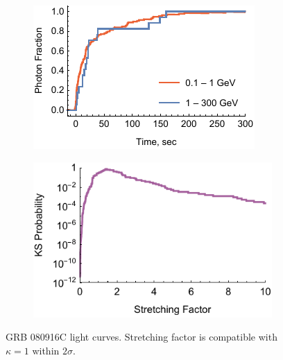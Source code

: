 \documentclass{article}
\begin{document}
\begin{figure}
        \centering
        \begin{subfigure}{0.49\textwidth}
                \includegraphics[width=\textwidth]{lightCurve080916C}
                \label{fig:lightCurve080916C}
        \end{subfigure}
        \begin{subfigure}{0.49\textwidth}
                \includegraphics[width=\textwidth]{probabilities080916C}
                \label{fig:probabilities080916C}
        \end{subfigure}
        \caption{GRB 080916C light curves. Stretching factor is compatible with $\kappa = 1$ within $2\sigma$.}
        \label{fig:grb080916C}
\end{figure}
\end{document}
